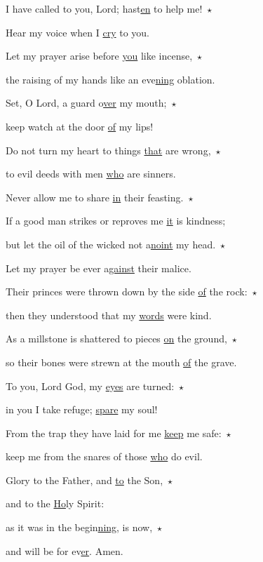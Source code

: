 \noindent I have called to you, Lord; hast\uline{en} to help me!~$\star$~\nopagebreak

Hear my voice when I \uline{cry} to you.

\noindent Let my prayer arise before \uline{you} like incense,~$\star$~\nopagebreak

the raising of my hands like an eve\uline{ning} oblation.

\noindent Set, O Lord, a guard o\uline{ver} my mouth;~$\star$~\nopagebreak

keep watch at the door \uline{of} my lips!

\noindent Do not turn my heart to things \uline{that} are wrong,~$\star$~\nopagebreak

to evil deeds with men \uline{who} are sinners.

\noindent Never allow me to share \uline{in} their feasting.~$\star$~\nopagebreak

If a good man strikes or reproves me \uline{it} is kindness;

\noindent but let the oil of the wicked not a\uline{noint} my head.~$\star$~\nopagebreak

Let my prayer be ever a\uline{gainst} their malice.

\noindent Their princes were thrown down by the side \uline{of} the rock:~$\star$~\nopagebreak

then they understood that my \uline{words} were kind.

\noindent As a millstone is shattered to pieces \uline{on} the ground,~$\star$~\nopagebreak

so their bones were strewn at the mouth \uline{of} the grave.

\noindent To you, Lord God, my \uline{eyes} are turned:~$\star$~\nopagebreak

in you I take refuge; \uline{spare} my soul!

\noindent From the trap they have laid for me \uline{keep} me safe:~$\star$~\nopagebreak

keep me from the snares of those \uline{who} do evil.

\noindent Glory to the Father, and \uline{to} the Son,~$\star$~\nopagebreak

and to the \uline{Ho}ly Spirit:

\noindent as it was in the begin\uline{ning}, is now,~$\star$~\nopagebreak

and will be for ev\uline{er}. Amen.
